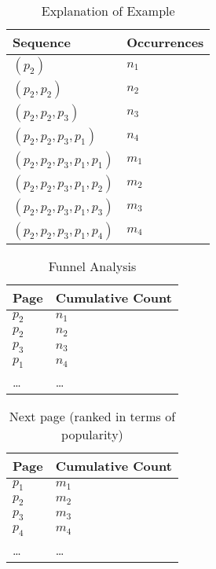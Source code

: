 \newpage
\clearpage
\begin{table}[ht]
\centering
\begin{tabular}{|l|l|} \hline \hline 
{\bf Sequence} & {\bf Occurrences} \\ \hline \hline
\((p_2)\) & \(n_1\) \\ \hline
\((p_2, p_2)\) & \(n_2\) \\ \hline
\((p_2, p_2, p_3)\) & \(n_3\) \\ \hline
\((p_2, p_2, p_3, p_1)\) & \(n_4\) \\ \hline \hline
\((p_2, p_2, p_3, p_1, p_1)\) & \(m_1\) \\ \hline 
\((p_2, p_2, p_3, p_1, p_2)\) & \(m_2\) \\ \hline 
\((p_2, p_2, p_3, p_1, p_3)\) & \(m_3\) \\ \hline 
\((p_2, p_2, p_3, p_1, p_4)\) & \(m_4\) \\ \hline 
\hline
\end{tabular}
\caption{Explanation of Example}
\label{tbl_example_1}
\end{table}

\begin{table}[ht]
\centering
\begin{tabular}{|l|l|} \hline \hline 
{\bf Page} & {\bf Cumulative Count} \\ \hline \hline 
\(p_2\) & \(n_1\) \\ \hline 
\(p_2\) & \(n_2\) \\ \hline 
\(p_3\) & \(n_3\) \\ \hline 
\(p_1\) & \(n_4\) \\ \hline 
\ldots & \ldots \\ \hline
\hline
\end{tabular}
\caption{Funnel Analysis}
\label{tbl_funnel}
\end{table}

\begin{table}[ht]
\centering
\begin{tabular}{|l|l|} \hline \hline 
{\bf Page} & {\bf Cumulative Count} \\ \hline \hline 
\(p_1\) & \(m_1\) \\ \hline 
\(p_2\) & \(m_2\) \\ \hline 
\(p_3\) & \(m_3\) \\ \hline 
\(p_4\) & \(m_4\) \\ \hline 
\ldots & \ldots \\ \hline
\hline
\end{tabular}
\caption{Next page (ranked in terms of popularity)}
\label{tbl_next_steps}
\end{table}

